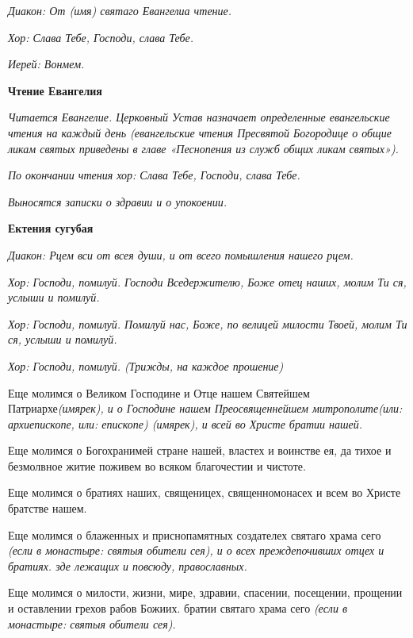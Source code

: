 \itshape Диакон:\normalfont{} От \itshape (имя\normalfont{}) святаго Евангелиа чтение.


\itshape Хор\normalfont{}: Слава Тебе, Господи, слава Тебе.


\itshape Иерей:\normalfont{} Вонмем.


\medskip\bfseries Чтение Евангелия\normalfont{}\nopagebreak


\itshape Читается Евангелие. Церковный Устав назначает определенные евангельские чтения на каждый день (евангельские чтения Пресвятой Богородице о общие ликам святых приведены в главе «Песнопения из служб общих ликам святых»).\normalfont{}


\itshape По окончании чтения хор:\normalfont{} Слава Тебе, Господи, слава Тебе.


\itshape Выносятся записки о здравии и о упокоении.\normalfont{}


\medskip\bfseries Ектения сугубая\normalfont{}\nopagebreak


\itshape Диакон:\normalfont{} Рцем вси от всея души, и от всего помышления нашего рцем.


\itshape  Хор:\normalfont{} Господи, помилуй. Господи Вседержителю, Боже отец наших, молим Ти ся, услыши и помилуй.


\itshape  Хор:\normalfont{} Господи, помилуй. Помилуй нас, Боже, по велицей милости Твоей, молим Ти ся, услыши и помилуй.


\itshape  Хор:\normalfont{} Господи, помилуй. \itshape (Трижды, на каждое прошение)\normalfont{} 


Еще молимся о Великом Господине и Отце нашем Святейшем Патриархе\itshape  (имярек)\normalfont{}, и о Господине нашем Преосвященнейшем митрополите\itshape  (или:\normalfont{} архиепископе\itshape , или:\normalfont{} епископе\itshape ) (имярек)\normalfont{}, и всей во Христе братии нашей. 


Еще молимся о Богохранимей стране нашей, властех и воинстве ея, да тихое и безмолвное житие поживем во всяком благочестии и чистоте. 


Еще молимся о братиях наших, священицех, священномонасех и всем во Христе братстве нашем.


Еще молимся о блаженных и приснопамятных создателех святаго храма сего \itshape (если в монастыре:\normalfont{} святыя обители сея), и о всех преждепочивших отцех и братиях. зде лежащих и повсюду, православных. 


Еще молимся о милости, жизни, мире, здравии, спасении, посещении, прощении и оставлении грехов рабов Божиих. братии святаго храма сего \itshape (если в монастыре:\normalfont{} святыя обители сея). 


